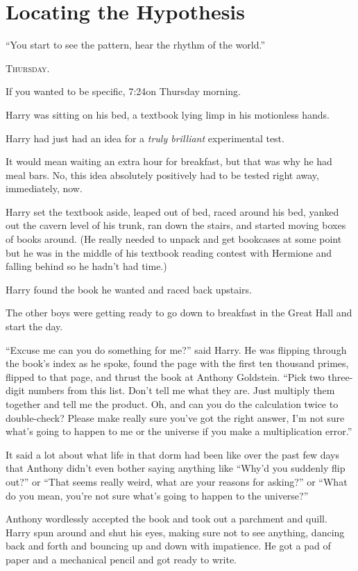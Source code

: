 \chapter{Locating the Hypothesis}

\epigraph{“You start to see the pattern, hear the rhythm of the world.”}{}

\lettrine{T}{hursday.}

\quad\quad If you wanted to be specific, 7:24\AM on Thursday morning.

Harry was sitting on his bed, a textbook lying limp in his motionless hands.

Harry had just had an idea for a \emph{truly brilliant} experimental test.

It would mean waiting an extra hour for breakfast, but that was why he had meal bars. No, this idea absolutely positively had to be tested right away, immediately, now.

Harry set the textbook aside, leaped out of bed, raced around his bed, yanked out the cavern level of his trunk, ran down the stairs, and started moving boxes of books around. (He really needed to unpack and get bookcases at some point but he was in the middle of his textbook reading contest with Hermione and falling behind so he hadn’t had time.)

Harry found the book he wanted and raced back upstairs.

The other boys were getting ready to go down to breakfast in the Great Hall and start the day.

“Excuse me can you do something for me?” said Harry. He was flipping through the book’s index as he spoke, found the page with the first ten thousand primes, flipped to that page, and thrust the book at Anthony Goldstein. “Pick two three-digit numbers from this list. Don’t tell me what they are. Just multiply them together and tell me the product. Oh, and can you do the calculation twice to double-check? Please make really sure you’ve got the right answer, I’m not sure what’s going to happen to me or the universe if you make a multiplication error.”

It said a lot about what life in that dorm had been like over the past few days that Anthony didn’t even bother saying anything like “Why’d you suddenly flip out?” or “That seems really weird, what are your reasons for asking?” or “What do you mean, you’re not sure what’s going to happen to the universe?”

Anthony wordlessly accepted the book and took out a parchment and quill. Harry spun around and shut his eyes, making sure not to see anything, dancing back and forth and bouncing up and down with impatience. He got a pad of paper and a mechanical pencil and got ready to write.

